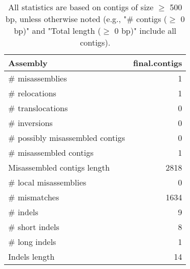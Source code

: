 \documentclass[12pt,a4paper]{article}
\begin{document}
\begin{table}[ht]
\begin{center}
\caption{All statistics are based on contigs of size $\geq$ 500 bp, unless otherwise noted (e.g., "\# contigs ($\geq$ 0 bp)" and "Total length ($\geq$ 0 bp)" include all contigs).}
\begin{tabular}{|l*{1}{|r}|}
\hline
Assembly & final.contigs \\ \hline
\# misassemblies & 1 \\ \hline
\hspace{5mm}\# relocations & 1 \\ \hline
\hspace{5mm}\# translocations & 0 \\ \hline
\hspace{5mm}\# inversions & 0 \\ \hline
\# possibly misassembled contigs & 0 \\ \hline
\# misassembled contigs & 1 \\ \hline
Misassembled contigs length & 2818 \\ \hline
\# local misassemblies & 0 \\ \hline
\# mismatches & 1634 \\ \hline
\# indels & 9 \\ \hline
\hspace{5mm}\# short indels & 8 \\ \hline
\hspace{5mm}\# long indels & 1 \\ \hline
Indels length & 14 \\ \hline
\end{tabular}
\end{center}
\end{table}
\end{document}

